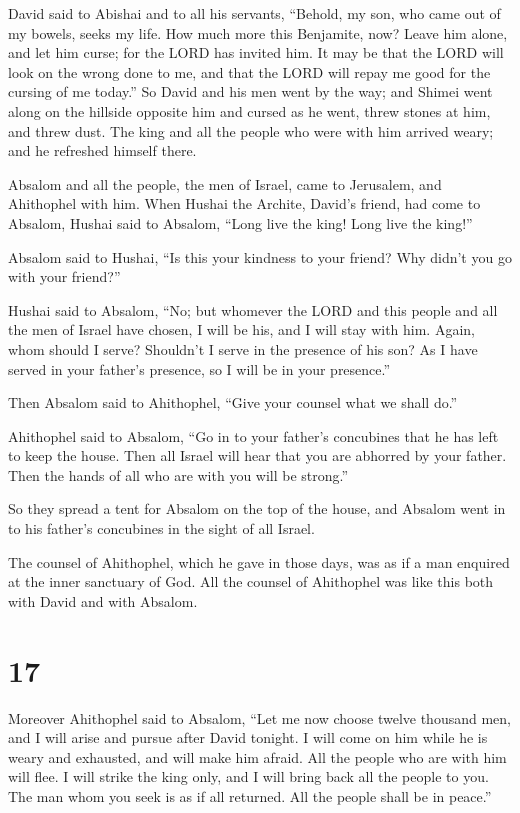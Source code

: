  David said to Abishai and to all his servants, ``Behold,
my son, who came out of my bowels, seeks my life. How much more this
Benjamite, now? Leave him alone, and let him curse; for the LORD has
invited him.  It may be that the LORD will look on the
wrong done to me, and that the LORD will repay me good for the cursing
of me today.''  So David and his men went by the way; and
Shimei went along on the hillside opposite him and cursed as he went,
threw stones at him, and threw dust.  The king and all the
people who were with him arrived weary; and he refreshed himself there.

 Absalom and all the people, the men of Israel, came to
Jerusalem, and Ahithophel with him.  When Hushai the
Archite, David's friend, had come to Absalom, Hushai said to Absalom,
``Long live the king! Long live the king!''

 Absalom said to Hushai, ``Is this your kindness to your
friend? Why didn't you go with your friend?''

 Hushai said to Absalom, ``No; but whomever the LORD and
this people and all the men of Israel have chosen, I will be his, and I
will stay with him.  Again, whom should I serve? Shouldn't
I serve in the presence of his son? As I have served in your father's
presence, so I will be in your presence.''

 Then Absalom said to Ahithophel, ``Give your counsel what
we shall do.''

 Ahithophel said to Absalom, ``Go in to your father's
concubines that he has left to keep the house. Then all Israel will hear
that you are abhorred by your father. Then the hands of all who are with
you will be strong.''

 So they spread a tent for Absalom on the top of the house,
and Absalom went in to his father's concubines in the sight of all
Israel.

 The counsel of Ahithophel, which he gave in those days,
was as if a man enquired at the inner sanctuary of God. All the counsel
of Ahithophel was like this both with David and with Absalom.

\hypertarget{section-16}{%
\section{17}\label{section-16}}

 Moreover Ahithophel said to Absalom, ``Let me now choose
twelve thousand men, and I will arise and pursue after David tonight.
 I will come on him while he is weary and exhausted, and
will make him afraid. All the people who are with him will flee. I will
strike the king only,  and I will bring back all the people
to you. The man whom you seek is as if all returned. All the people
shall be in peace.''

